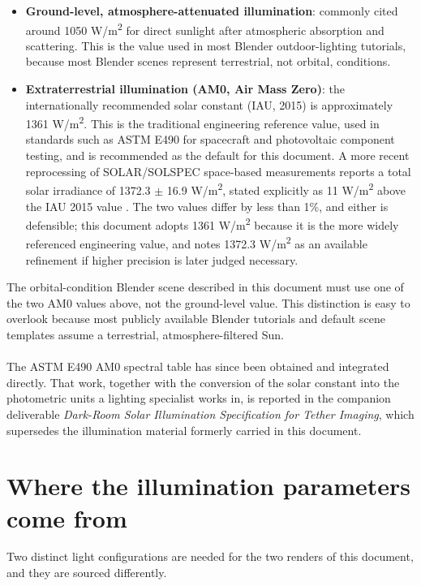 \begin{itemize}
    \item \textbf{Ground-level, atmosphere-attenuated illumination}: commonly cited around 1050 W/m\textsuperscript{2} for direct sunlight after atmospheric absorption and scattering. This is the value used in most Blender outdoor-lighting tutorials, because most Blender scenes represent terrestrial, not orbital, conditions.
    \item \textbf{Extraterrestrial illumination (AM0, Air Mass Zero)}: the internationally recommended solar constant (IAU, 2015) is approximately 1361 W/m\textsuperscript{2}. This is the traditional engineering reference value, used in standards such as ASTM E490 for spacecraft and photovoltaic component testing, and is recommended as the default for this document. A more recent reprocessing of SOLAR/SOLSPEC space-based measurements reports a total solar irradiance of 1372.3 $\pm$ 16.9 W/m\textsuperscript{2}, stated explicitly as 11 W/m\textsuperscript{2} above the IAU 2015 value \cite{meftah2018solariss}. The two values differ by less than 1\%, and either is defensible; this document adopts 1361 W/m\textsuperscript{2} because it is the more widely referenced engineering value, and notes 1372.3 W/m\textsuperscript{2} as an available refinement if higher precision is later judged necessary.
\end{itemize}

The orbital-condition Blender scene described in this document must use one of the two AM0 values above, not the ground-level value. This distinction is easy to overlook because most publicly available Blender tutorials and default scene templates assume a terrestrial, atmosphere-filtered Sun.
\\\\
The ASTM E490 AM0 spectral table has since been obtained and integrated directly. That work, together with the conversion of the solar constant into the photometric units a lighting specialist works in, is reported in the companion deliverable \textit{Dark-Room Solar Illumination Specification for Tether Imaging}, which supersedes the illumination material formerly carried in this document.

\section{Where the illumination parameters come from}
\label{sec:illumination-pointer}

Two distinct light configurations are needed for the two renders of this document, and they are sourced differently.

